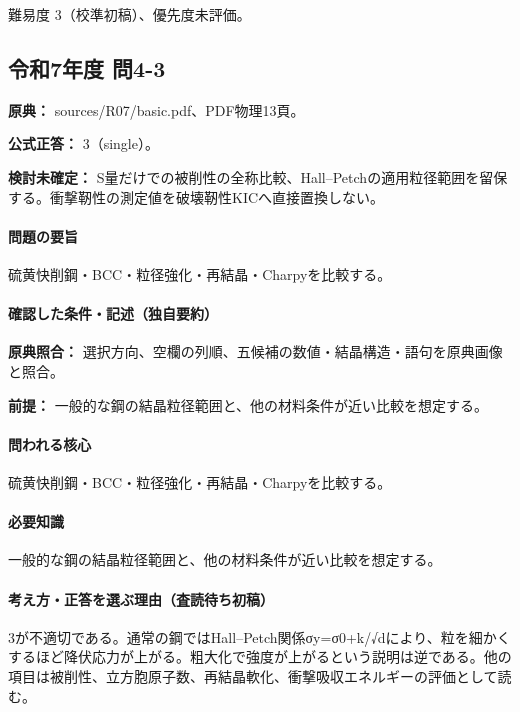 \par 難易度 3（校準初稿）、優先度未評価。

\subsection{令和7年度 問4-3}
\label{q:r07-reg-basic-4-3}

\noindent\textbf{原典：} sources/R07/basic.pdf、PDF物理13頁。

\textbf{公式正答：} 3（single）。

\par\textbf{検討未確定：} S量だけでの被削性の全称比較、Hall–Petchの適用粒径範囲を留保する。衝撃靭性の測定値を破壊靭性KICへ直接置換しない。

\paragraph{問題の要旨} 硫黄快削鋼・BCC・粒径強化・再結晶・Charpyを比較する。

\paragraph{確認した条件・記述（独自要約）}\mbox{}\par

\noindent\textbf{原典照合：} 選択方向、空欄の列順、五候補の数値・結晶構造・語句を原典画像と照合。\par

\noindent\textbf{前提：} 一般的な鋼の結晶粒径範囲と、他の材料条件が近い比較を想定する。\par

\paragraph{問われる核心} 硫黄快削鋼・BCC・粒径強化・再結晶・Charpyを比較する。

\paragraph{必要知識} 一般的な鋼の結晶粒径範囲と、他の材料条件が近い比較を想定する。

\paragraph{考え方・正答を選ぶ理由（査読待ち初稿）} 3が不適切である。通常の鋼ではHall–Petch関係σy=σ0+k/√dにより、粒を細かくするほど降伏応力が上がる。粗大化で強度が上がるという説明は逆である。他の項目は被削性、立方胞原子数、再結晶軟化、衝撃吸収エネルギーの評価として読む。

